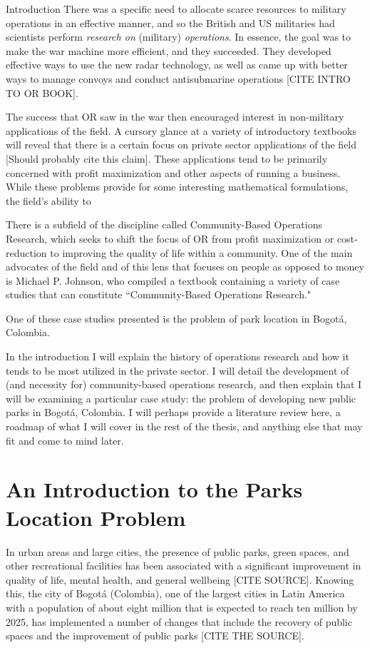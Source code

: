 \documentclass[12pt]{pom_thesis}
\theoremstyle{definition}
\begin{document}
\begin{chapter}{Introduction}
	There was a specific need to allocate scarce resources to military operations in an effective manner, and so the British and US militaries had scientists perform \textit{research on} (military) \textit{operations}. In essence, the goal was to make the war machine more efficient, and they succeeded. They developed effective ways to use the new radar technology, as well as came up with better ways to manage convoys and conduct antisubmarine operations [CITE INTRO TO OR BOOK]. 
	
	The success that OR saw in the war then encouraged interest in non-military applications of the field.
	A cursory glance at a variety of introductory textbooks will reveal that there is a certain focus on private sector applications of the field [Should probably cite this claim]. These applications tend to be primarily concerned with profit maximization and other aspects of running a business. While these problems provide for some interesting mathematical formulations, the field's ability to 
	
	There is a subfield of the discipline called Community-Based Operations Research, which seeks to shift the focus of OR from profit maximization or cost-reduction to improving the quality of life within a community. One of the main advocates of the field and of this lens that focuses on people as opposed to money is Michael P. Johnson, who compiled a textbook containing a variety of case studies that can constitute ``Community-Based Operations Research." 
	
	One of these case studies presented is the problem of park location in Bogot\'{a}, Colombia.

In the introduction I will explain the history of operations research and how it tends to be most utilized in the private sector. I will detail the development of (and necessity for) community-based operations research, and then explain that I will be examining a particular case study: the problem of developing new public parks in Bogot\'a, Colombia. I will perhaps provide a literature review here, a roadmap of what I will cover in the rest of the thesis, and anything else that may fit and come to mind later.

\section{An Introduction to the Parks Location Problem}

	In urban areas and large cities, the presence of public parks, green spaces, and other recreational facilities has been associated with a significant improvement in quality of life, mental health, and general wellbeing [CITE SOURCE]. Knowing this, the city of Bogot\'{a} (Colombia), one of the largest cities in Latin America with a population of about eight million that is expected to reach ten million by 2025, has implemented a number of changes that include the recovery of public spaces and the improvement of public parks [CITE THE SOURCE]. 
	

\end{chapter}
\end{document}
